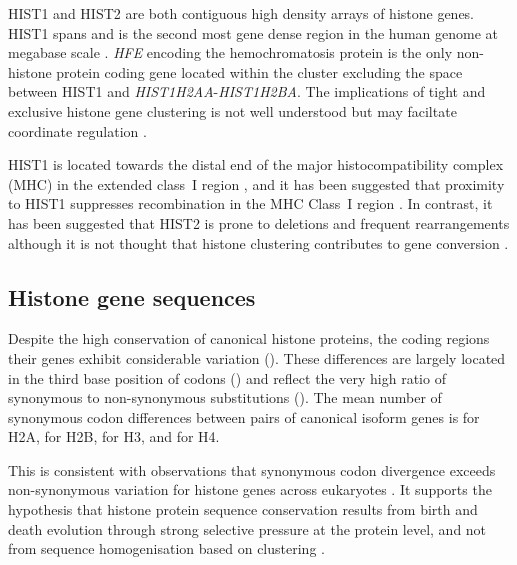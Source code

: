	HIST1 and HIST2 are both contiguous high density arrays of histone genes. 
	HIST1 spans \HISTOneSpan{} 
	and is the second most gene dense region in the human genome at megabase scale \citep{MHC-III-analysis}.
	\textit{HFE} encoding the hemochromatosis protein \citep{AlbigDoenecke1998} 
	is the only non-histone protein coding gene located within the cluster
	excluding the space between HIST1 and \textit{HIST1H2AA}-\textit{HIST1H2BA}. 
	The implications of tight and exclusive histone gene clustering 
	is not well understood \citep{Eirinlopez2009} 
	but may faciltate coordinate regulation \citep{close-regulators}.

	HIST1 is located towards the distal end of the major histocompatibility complex (MHC) 
	in the extended class~I region \citep{MHC-I-transcript, MHC-complete-sequencing-1999}, 
	and it has been suggested that proximity to HIST1 
	suppresses recombination in the MHC Class~I region \citep{MHC-repressed-by-HIST}. 
	In contrast, it has been suggested that HIST2 is prone to 
	deletions and frequent rearrangements \citep{HISTTwo-prone-deletion-discovery, HISTTwo-prone-deletion-focus}
	although it is not thought that histone clustering contributes to gene conversion \citep{NeiRooney2005}.

\subsection{Histone gene sequences}
	Despite the high conservation of canonical histone proteins, 
	the coding regions their genes exhibit considerable variation (). 
	These differences are largely located in the third base position of codons ()
	and reflect the very high ratio of synonymous to non-synonymous substitutions ().
	The mean number of synonymous codon differences between pairs of canonical isoform genes is 
	 for H2A, 
	 for H2B, 
	 for H3, 
	and  for H4.

	This is consistent with observations that 
	synonymous codon divergence exceeds non-synonymous variation 
	for histone genes across eukaryotes \citep{Piontkivska2002, Rooney2002}. 
	It supports the hypothesis that histone protein sequence conservation 
	results from birth and death evolution through strong selective pressure at the protein level, 
	and not from sequence homogenisation based on clustering \citep{NeiRooney2005}.

